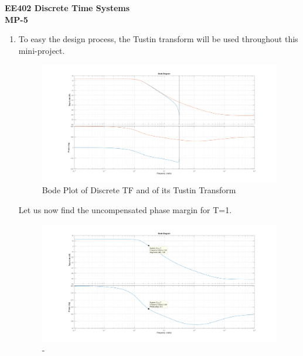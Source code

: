 \documentclass[a4paper,12pt]{article}
\begin{document}
\begin{center}
	\textbf{\large EE402 Discrete Time Systems \\[0.2cm] MP-5} \\
\end{center}


\begin{enumerate}
	\item To easy the design process, the Tustin transform will be used throughout this mini-project.
		
		
	
	
	
	\begin{figure}[H]
			\center
			\setlength{\unitlength}{\textwidth} 
		\includegraphics[width=1.0\unitlength]{images/a1}
  		\caption{\label{fig:a}Bode Plot of Discrete TF and of its Tustin Transform }
	\end{figure}
	
	Let us now find the uncompensated phase margin for T=1. 
	
	\begin{figure}[H]
			\center
			\setlength{\unitlength}{\textwidth} 
		\includegraphics[width=1.0\unitlength]{images/c}
  		\caption{\label{fig:c}-}
	\end{figure}
	

\end{enumerate}
\end{document}
